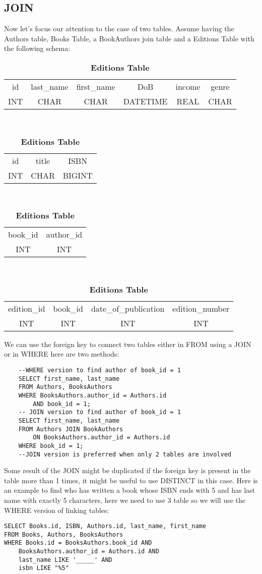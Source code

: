 \documentclass[a4page, 11pt]{article}
\begin{document}
\subsection{JOIN}
Now let's focus our attention to the case of two tables. Assume having the Authors table, Books Table, a BookAuthors join table and a Editions Table with the following schema:
\begin{table}[h]
	\centering
	\begin{tabular}{c c c c c c}
	id & last\_name & first\_name & DoB & income & genre\\
	INT & CHAR & CHAR & DATETIME & REAL & CHAR
	\end{tabular}
\caption*{\textbf{Authors Table}}
~\\
	\centering
	\begin{tabular}{c c c}
	id & title & ISBN\\
	INT & CHAR & BIGINT
	\end{tabular}
\caption*{\textbf{Book Table}}
~\\
	\centering
	\begin{tabular}{c c}
	book\_id & author\_id\\
	INT & INT
	\end{tabular}
\caption*{\textbf{BooksAuthors Table}}
~\\
	\begin{tabular}{c c c c}
	edition\_id & book\_id & date\_of\_publication & edition\_number\\
	INT & INT & INT & INT
\end{tabular}
\caption*{\textbf{Editions Table}}
\end{table}

We can use the foreign key to connect two tables either in FROM using a JOIN or in WHERE here are two methods:

\begin{lstlisting}
	--WHERE version to find author of book_id = 1
	SELECT first_name, last_name
	FROM Authors, BooksAuthors
	WHERE BooksAuthors.author_id = Authors.id
		AND book_id = 1;
	-- JOIN version to find author of book_id = 1
	SELECT first_name, last_name
	FROM Authors JOIN BookAuthors
		ON BooksAuthors.author_id = Authors.id
	WHERE book_id = 1;
	--JOIN version is preferred when only 2 tables are involved
\end{lstlisting}

Some result of the JOIN might be duplicated if the foreign key is present in the table more than 1 times, it might be useful to use DISTINCT in this case.
Here is an example to find who has written a book whose ISBN ends with 5 and has last name with exactly 5 characters, here we need to use 3 table so we will use the WHERE version of linking tables:
\begin{lstlisting}
SELECT Books.id, ISBN, Authors.id, last_name, first_name
FROM Books, Authors, BooksAuthors
WHERE Books.id = BooksAuthors.book_id AND
	BooksAuthors.author_id = Authors.id AND
	last_name LIKE '_____' AND
	isbn LIKE "%5"
\end{lstlisting}
\end{document}
